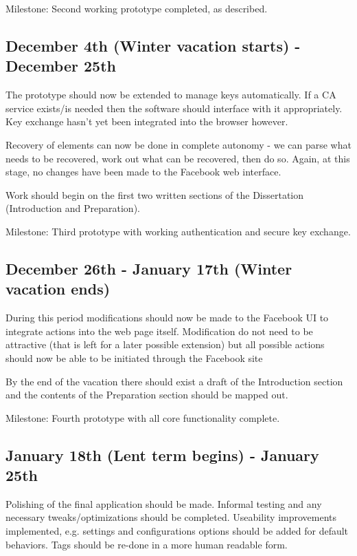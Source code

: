 \documentclass[12pt]{article}
\begin{document}
Milestone: Second working prototype completed, as described.


\subsection*{December 4th (Winter vacation starts) - December 25th}

The prototype should now be extended to manage keys automatically. If a CA service exists/is needed then the software should interface with it appropriately. Key exchange hasn't yet been integrated into the browser however.

Recovery of elements can now be done in complete autonomy - we can parse what needs to be recovered, work out what can be recovered, then do so. Again, at this stage, no changes have been made to the Facebook web interface.

Work should begin on the first two written sections of the Dissertation (Introduction and Preparation).

Milestone: Third prototype with working authentication and secure key exchange.

\subsection*{December 26th  - January 17th (Winter vacation ends)}

During this period modifications should now be made to the Facebook UI to integrate actions into the web page itself. Modification do not need to be attractive (that is left for a later possible extension) but all possible actions should now be able to be initiated through the Facebook site

By the end of the vacation there should exist a draft of the Introduction section and the contents of the Preparation section should be mapped out.

Milestone: Fourth prototype with all core functionality complete.

\subsection*{January 18th (Lent term begins) - January 25th}

Polishing of the final application should be made. Informal testing and any necessary tweaks/optimizations should be completed. Useability improvements implemented, e.g. settings and configurations options should be added for default behaviors. Tags should be re-done in a more human readable form.
\end{document}
